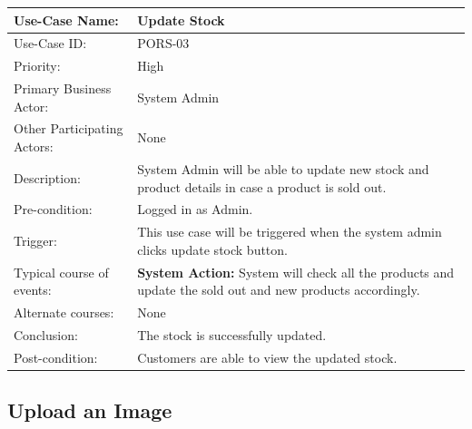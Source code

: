 \begin{center}
    \begin{tabular}{ @{}|p{7cm}||p{7cm}|  }
    \hline
    Use-Case Name: & Update Stock  \\ \hline
    Use-Case ID: & PORS-03 \\ \hline
    Priority: & High \\ \hline
    Primary Business Actor: & System Admin \\ \hline
    Other Participating Actors: & None \\ \hline
    Description: & System Admin will be able to update new stock and product details in case a product is sold out. \\ \hline
    Pre-condition: & Logged in as Admin.  \\ \hline
    Trigger: & This use case will be triggered when the system admin clicks update stock button. \\ \hline
    Typical course of events: & \textbf{System Action:} \newline System will check all the products and update the sold out and new products accordingly.
 \\ \hline
    Alternate courses: & None \\ \hline
    Conclusion: & The stock is successfully updated. \\ \hline
    Post-condition: & Customers are able to view the updated stock.\\ \hline
    \end{tabular}
\end{center}

\subsection{Upload an Image}

